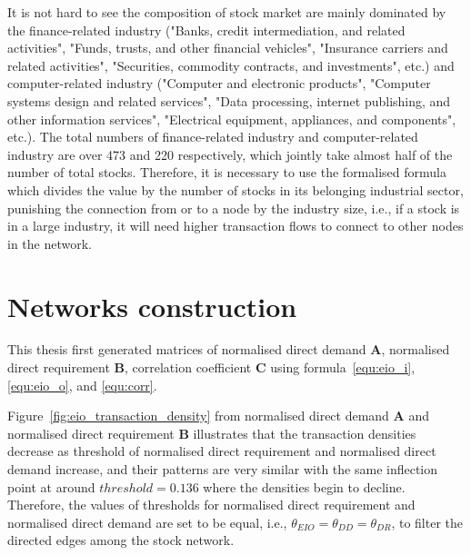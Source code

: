 It is not hard to see the composition of stock market are mainly dominated by the finance-related industry ("Banks, credit intermediation, and related activities", "Funds, trusts, and other financial vehicles", "Insurance carriers and related activities", "Securities, commodity contracts, and investments", etc.) and computer-related industry ("Computer and electronic products", "Computer systems design and related services", "Data processing, internet publishing, and other information services", "Electrical equipment, appliances, and components", etc.). The total numbers of finance-related industry and computer-related industry are over 473 and 220 respectively, which jointly take almost half of the number of total stocks. Therefore, it is necessary to use the formalised formula~ which divides the value by the number of stocks in its belonging industrial sector, punishing the connection from or to a node by the industry size, i.e., if a stock is in a large industry, it will need higher transaction flows to connect to other nodes in the network.

\section{Networks construction}
This thesis first generated matrices of normalised direct demand \textbf{A}, normalised direct requirement \textbf{B}, correlation coefficient \textbf{C} using formula~\ref{equ:eio_i}, \ref{equ:eio_o}, and \ref{equ:corr}.

Figure~\ref{fig:eio_transaction_density} from normalised direct demand \textbf{A} and normalised direct requirement \textbf{B} illustrates that the transaction densities decrease as threshold of normalised direct requirement and normalised direct demand increase, and their patterns are very similar with the same inflection point at around $threshold=0.136$ where the densities begin to decline. Therefore, the values of thresholds for normalised direct requirement and normalised direct demand are set to be equal, i.e., $\theta_{EIO}=\theta_{DD}=\theta_{DR}$, to filter the directed edges among the stock network.

